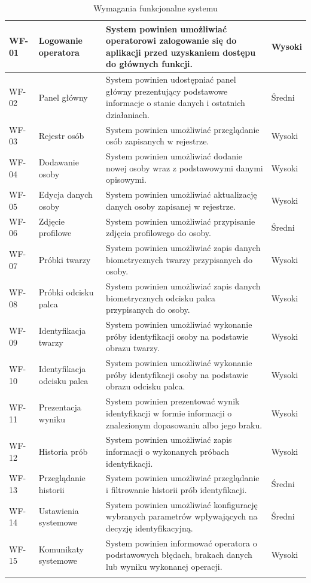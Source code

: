 \begin{xltabular}{\textwidth}{|
    >{\RaggedRight\arraybackslash}p{1.5cm}|
    >{\RaggedRight\arraybackslash}p{3.2cm}|
    >{\RaggedRight\arraybackslash}X|
    >{\RaggedRight\arraybackslash}p{1.8cm}|}
    WF-01 & Logowanie operatora & System powinien umożliwiać operatorowi zalogowanie się do aplikacji przed uzyskaniem dostępu do głównych funkcji. & Wysoki \\
    \hline
    WF-02 & Panel główny & System powinien udostępniać panel główny prezentujący podstawowe informacje o stanie danych i ostatnich działaniach. & Średni \\
    \hline
    WF-03 & Rejestr osób & System powinien umożliwiać przeglądanie osób zapisanych w rejestrze. & Wysoki \\
    \hline
    WF-04 & Dodawanie osoby & System powinien umożliwiać dodanie nowej osoby wraz z podstawowymi danymi opisowymi. & Wysoki \\
    \hline
    WF-05 & Edycja danych osoby & System powinien umożliwiać aktualizację danych osoby zapisanej w rejestrze. & Wysoki \\
    \hline
    WF-06 & Zdjęcie profilowe & System powinien umożliwiać przypisanie zdjęcia profilowego do osoby. & Średni \\
    \hline
    WF-07 & Próbki twarzy & System powinien umożliwiać zapis danych biometrycznych twarzy przypisanych do osoby. & Wysoki \\
    \hline
    WF-08 & Próbki odcisku palca & System powinien umożliwiać zapis danych biometrycznych odcisku palca przypisanych do osoby. & Wysoki \\
    \hline
    WF-09 & Identyfikacja twarzy & System powinien umożliwiać wykonanie próby identyfikacji osoby na podstawie obrazu twarzy. & Wysoki \\
    \hline
    WF-10 & Identyfikacja odcisku palca & System powinien umożliwiać wykonanie próby identyfikacji osoby na podstawie obrazu odcisku palca. & Wysoki \\
    \hline
    WF-11 & Prezentacja wyniku & System powinien prezentować wynik identyfikacji w formie informacji o znalezionym dopasowaniu albo jego braku. & Wysoki \\
    \hline
    WF-12 & Historia prób & System powinien umożliwiać zapis informacji o wykonanych próbach identyfikacji. & Wysoki \\
    \hline
    WF-13 & Przeglądanie historii & System powinien umożliwiać przeglądanie i filtrowanie historii prób identyfikacji. & Średni \\
    \hline
    WF-14 & Ustawienia systemowe & System powinien umożliwiać konfigurację wybranych parametrów wpływających na decyzję identyfikacyjną. & Średni \\
    \hline
    WF-15 & Komunikaty systemowe & System powinien informować operatora o podstawowych błędach, brakach danych lub wyniku wykonanej operacji. & Wysoki \\
    \hline

    \caption{Wymagania funkcjonalne systemu}
    \label{tab:wymagania-funkcjonalne} \\
\end{xltabular}

